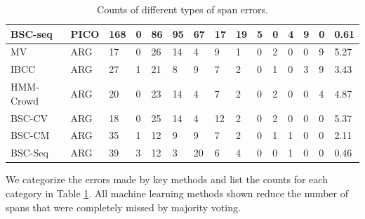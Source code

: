\begin{table}[h]
\begin{tabular}{l l l l l l l l l l l l l l l }
BSC-seq    & PICO & 168 & 0 & 86 & 95 & 67 & 17 & 19 & 5 & 0 & 4 & 9 & 0 & 0.61 \\
\midrule 
MV & ARG & 17 &  0 & 26 & 14 &  4  &  9 & 1 &  0 & 2 &  0 &  0 & 9 & 5.27 \\
IBCC & ARG & 27 & 1 & 21 & 8 & 9 & 7 & 2 & 0 & 1 & 0 & 3 & 9 & 3.43 \\
HMM-Crowd & ARG & 20 & 0 & 23 & 14 & 4 & 7 & 2 & 0 & 2 & 0 & 0 & 4 & 4.87 \\
BSC-CV & ARG & 18 & 0 & 25 & 14 & 4 & 12 & 2 & 0 & 2 & 0 & 0 & 0 & 5.37 \\
BSC-CM & ARG & 35 & 1 & 12 & 9 & 9 & 7 & 2 & 0 & 1 & 1 & 0 & 0 & 2.11 \\
BSC-Seq & ARG & 39 & 3 & 12 & 3 & 20 & 6 & 4 & 0 & 0 & 1 & 0 & 0 & 0.46 \\
\bottomrule
\end{tabular}
\caption{Counts of different types of span errors.}
\label{tab:error_analysis}
\end{table}
We categorize the errors made by key methods and list the
counts for each category in Table \ref{tab:error_analysis}.
All machine learning methods shown reduce the number of spans that were completely missed by majority
voting. 

